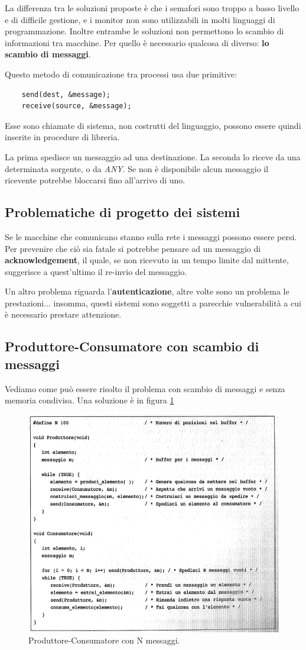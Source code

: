 La differenza tra le soluzioni proposte è che i semafori sono troppo a basso livello e di difficile gestione, e i monitor non sono utilizzabili in molti linguaggi di programmazione. Inoltre entrambe le soluzioni non permettono lo scambio di informazioni tra macchine.
Per quello è necessario qualcosa di diverso: \textbf{lo scambio di messaggi}.

Questo metodo di comunicazione tra processi usa due primitive:
\begin{verbatim}
    send(dest, &message);
    receive(source, &message);
\end{verbatim}

Esse sono chiamate di sistema, non costrutti del linguaggio, possono essere quindi inserite in procedure di libreria.

La prima spedisce un messaggio ad una destinazione. La seconda lo riceve da una determinata sorgente, o da \textit{ANY}. Se non è disponibile alcun messaggio il ricevente potrebbe bloccarsi fino all'arrivo di uno.

\subsection{Problematiche di progetto dei sistemi}
Se le macchine che comunicano stanno sulla rete i messaggi possono essere persi. Per prevenire che ciò sia fatale si potrebbe pensare ad un messaggio di \textbf{acknowledgement}, il quale, se non ricevuto in un tempo limite dal mittente, suggerisce a quest'ultimo il re-invio del messaggio.

Un altro problema riguarda l'\textbf{autenticazione}, altre volte sono un problema le prestazioni... insomma, questi sistemi sono soggetti a parecchie vulnerabilità a cui è necessario prestare attenzione.

\subsection{Produttore-Consumatore con scambio di messaggi}
Vediamo come può essere risolto il problema  con scambio di messaggi e senza memoria condivisa. Una soluzione è in figura \ref{producerconsumermessages}

\begin{figure}[H]
    \centering
    \includegraphics[width=0.7\linewidth]{assets/producerconsumermessages6.png}
    \caption{Produttore-Consumatore con N messaggi.}
    \label{producerconsumermessages}
\end{figure}

